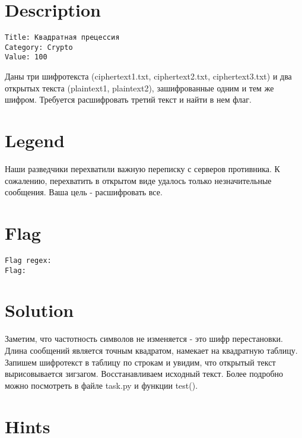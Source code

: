\documentclass{article}
\begin{document}
	
\renewcommand{\contentsname}{Contents}

\section{Description}

\tt Title: Квадратная прецессия \\

\tt Category: Crypto \\

\tt Value: 100

\begin{framed}
	Даны три шифротекста (ciphertext1.txt, ciphertext2.txt, ciphertext3.txt) и два открытых текста (plaintext1, plaintext2), зашифрованные одним и тем же шифром. Требуется расшифровать третий текст и найти в нем флаг.
\end{framed}

\section{Legend}

\begin{framed}
	Наши разведчики перехватили важную переписку с серверов противника. К сожалению, перехватить в открытом виде удалось только незначительные сообщения. Ваша цель - расшифровать все.
\end{framed}

\section{Flag}

\tt Flag regex: 
 \\

\tt Flag: 

\section{Solution}

Заметим, что частотность символов не изменяется - это шифр перестановки. Длина сообщений является точным квадратом, намекает на квадратную таблицу. Запишем шифротекст в таблицу по строкам и увидим, что открытый текст вырисовывается зигзагом. Восстанавливаем исходный текст.
Более подробно можно посмотреть в файле task.py и функции test().

\section{Hints}
\end{document}
